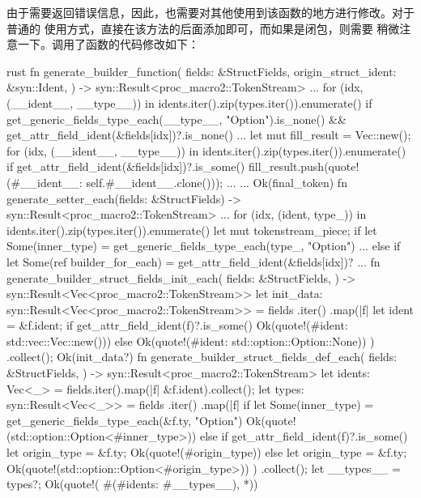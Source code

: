 由于需要返回错误信息，因此，也需要对其他使用到该函数的地方进行修改。对于普通的
使用方式，直接在该方法的后面添加即可，而如果是闭包，则需要
稍微注意一下。调用了函数的代码修改如下：
\begin{code-block}{rust}
fn generate_builder_function(
    fields: &StructFields,
    origin_struct_ident: &syn::Ident,
) -> syn::Result<proc_macro2::TokenStream> {
    ...
    for (idx, (__ident__, __type__)) in idents.iter().zip(types.iter()).enumerate() {
        if get_generic_fields_type_each(__type__, "Option").is_none()
            && get_attr_field_ident(&fields[idx])?.is_none()
        ...
    }
    let mut fill_result = Vec::new();
    for (idx, (__ident__, __type__)) in idents.iter().zip(types.iter()).enumerate() {
        if get_attr_field_ident(&fields[idx])?.is_some() {
            fill_result.push(quote!(#__ident__: self.#__ident__.clone()));
        }
        ...
    }
    ...
    Ok(final_token)
}
fn generate_setter_each(fields: &StructFields) -> syn::Result<proc_macro2::TokenStream> {
    ...
    for (idx, (ident, type_)) in idents.iter().zip(types.iter()).enumerate() {
        let mut tokenstream_piece;
        if let Some(inner_type) = get_generic_fields_type_each(type_, "Option") {
            ...
        } else if let Some(ref builder_for_each) = get_attr_field_ident(&fields[idx])? {
            ...
        }
    }
}
fn generate_builder_struct_fields_init_each(
    fields: &StructFields,
) -> syn::Result<Vec<proc_macro2::TokenStream>> {
    let init_data: syn::Result<Vec<proc_macro2::TokenStream>> = fields
        .iter()
        .map(|f| {
            let ident = &f.ident;
            if get_attr_field_ident(f)?.is_some() {
                Ok(quote!(#ident: std::vec::Vec::new()))
            } else {
                Ok(quote!(#ident: std::option::Option::None))
            }
        })
        .collect();
    Ok(init_data?)
}
fn generate_builder_struct_fields_def_each(
    fields: &StructFields,
) -> syn::Result<proc_macro2::TokenStream> {
    let idents: Vec<_> = fields.iter().map(|f| &f.ident).collect();
    let types: syn::Result<Vec<_>> = fields
        .iter()
        .map(|f| {
            if let Some(inner_type) = get_generic_fields_type_each(&f.ty, "Option") {
                Ok(quote!(std::option::Option<#inner_type>))
            } else if get_attr_field_ident(f)?.is_some() {
                let origin_type = &f.ty;
                Ok(quote!(#origin_type))
            } else {
                let origin_type = &f.ty;
                Ok(quote!(std::option::Option<#origin_type>))
            }
        })
        .collect();
    let __types__ = types?;
    Ok(quote!( #(#idents: #__types__), *))
}
\end{code-block}
